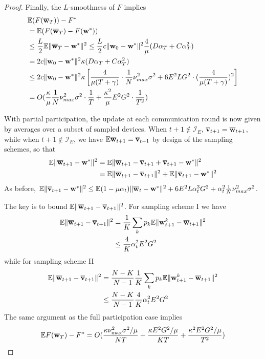 \begin{proof}
	Finally, the $L$-smoothness of $F$ implies 
	\begin{align*}
	& \mathbb{E}(F({\overline{\mathbf{w}}}_{T}))-F^{\ast}\\
	& =\mathbb{E}(F({\overline{\mathbf{w}}}_{T})-F({\mathbf{w}}^{\ast}))\\
	& \leq\frac{L}{2}\mathbb{E}\|{\overline{\mathbf{w}}}_{T}-{\mathbf{w}}^{\ast}\|^{2}\leq\frac{L}{2}c\|{\mathbf{w}}_{0}-{\mathbf{w}}^{\ast}\|^{2}\frac{4}{\mu}(D\alpha_{T}+C\alpha_{T}^{2})\\
	& =2c\|{\mathbf{w}}_{0}-{\mathbf{w}}^{\ast}\|^{2}\kappa(D\alpha_{T}+C\alpha_{T}^{2})\\
	& \leq2c\|{\mathbf{w}}_{0}-{\mathbf{w}}^{\ast}\|^{2}\kappa\left[\frac{4}{\mu(T+\gamma)}\cdot\frac{1}{N}\nu_{max}^{2}\sigma^{2}+6E^{2}LG^{2}\cdot(\frac{4}{\mu(T+\gamma)})^{2}\right]\\
	& =O(\frac{\kappa}{\mu}\frac{1}{N}\nu_{max}^{2}\sigma^{2}\cdot\frac{1}{T}+\frac{\kappa^{2}}{\mu}E^{2}G^{2}\cdot\frac{1}{T^{2}})
	\end{align*}
	
	With partial participation, the update at each communication round
	is now given by averages over a subset of sampled devices. When $t+1\notin\mathcal{I}_{E}$,
	${\overline{\mathbf{v}}}_{t+1}={\overline{\mathbf{w}}}_{t+1}$, while when $t+1\notin\mathcal{I}_{E}$,
	we have $\mathbb{E}{\overline{\mathbf{w}}}_{t+1}={\overline{\mathbf{v}}}_{t+1}$ by design
	of the sampling schemes, so that 
	\begin{align*}
	\mathbb{E}\|{\overline{\mathbf{w}}}_{t+1}-{\mathbf{w}}^{\ast}\|^{2} & =\mathbb{E}\|{\overline{\mathbf{w}}}_{t+1}-{\overline{\mathbf{v}}}_{t+1}+{\overline{\mathbf{v}}}_{t+1}-{\mathbf{w}}^{\ast}\|^{2}\\
	& =\mathbb{E}\|{\overline{\mathbf{w}}}_{t+1}-{\overline{\mathbf{v}}}_{t+1}\|^{2}+\mathbb{E}\|{\overline{\mathbf{v}}}_{t+1}-{\mathbf{w}}^{\ast}\|^{2}
	\end{align*}
	As before, $\mathbb{E}\|{\overline{\mathbf{v}}}_{t+1}-{\mathbf{w}}^{\ast}\|^{2}\leq\mathbb{E}(1-\mu\alpha_{t})\|{\overline{\mathbf{w}}}_{t}-{\mathbf{w}}^{\ast}\|^{2}+6E^{2}L\alpha_{t}^{3}G^{2}+\alpha_{t}^{2}\frac{1}{N}\nu_{max}^{2}\sigma^{2}$. 
	
	The key is to bound $\mathbb{E}\|{\overline{\mathbf{w}}}_{t+1}-{\overline{\mathbf{v}}}_{t+1}\|^{2}$.
	For sampling scheme I we have 
	\begin{align*}
	\mathbb{E}\|{\overline{\mathbf{w}}}_{t+1}-{\overline{\mathbf{v}}}_{t+1}\|^{2} & =\frac{1}{K}\sum_{k}p_{k}\mathbb{E}\|{\mathbf{w}}_{t+1}^{k}-{\overline{\mathbf{w}}}_{t+1}\|^{2}\\
	& \leq\frac{4}{K}\alpha_{t}^{2}E^{2}G^{2}
	\end{align*}
	while for sampling scheme II 
	\begin{align*}
	\mathbb{E}\|{\overline{\mathbf{w}}}_{t+1}-{\overline{\mathbf{v}}}_{t+1}\|^{2} & =\frac{N-K}{N-1}\frac{1}{K}\sum_{k}p_{k}\mathbb{E}\|{\mathbf{w}}_{t+1}^{k}-{\overline{\mathbf{w}}}_{t+1}\|^{2}\\
	& \leq\frac{N-K}{N-1}\frac{4}{K}\alpha_{t}^{2}E^{2}G^{2}
	\end{align*}
	The same argument as the full participation case implies 
	\begin{align*}
	\mathbb{E}F({\overline{\mathbf{w}}}_{T})-F^{\ast}=O(\frac{\kappa\nu_{\max}^{2}\sigma^{2}/\mu}{NT}+\frac{\kappa E^{2}G^{2}/\mu}{KT}+\frac{\kappa^{2}E^{2}G^{2}/\mu}{T^{2}})
	\end{align*}
	

\end{proof}
